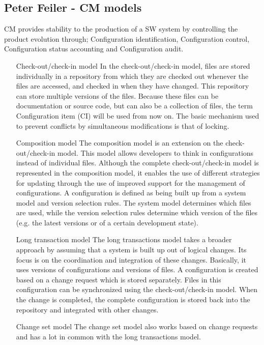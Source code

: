 \documentclass{article}
\begin{document}
\begin{itemize}
\begin{itemize}
    \subsection{Peter Feiler - CM models}
    CM provides stability to the production of a SW system by controlling the product evolution through; Configuration identification, Configuration control, Configuration status accounting and Configuration audit.
    \begin{itemize}
    \item [ Check-out/check-in model]
    In the check-out/check-in model, files are stored individually in a repository from which they are checked out whenever the files are accessed, and checked in when they have changed.
    This repository can store multiple versions of the files. Because these files can be documentation or source code, but can also be a collection of files, the term Configuration item (CI) will be used from now on.
    The basic mechanism used to prevent conflicts by simultaneous modifications is that of locking.
    \item[Composition model]
    The composition model is an extension on the check-out/check-in model. This model allows developers to think in configurations instead of individual files.
    Although the complete check-out/check-in model is represented in the composition model, it enables the use of different strategies for updating through the use of
    improved support for the management of configurations. A configuration is defined as being built up from a system model and version selection rules.
    The system model determines which files are used, while the version selection rules determine which version of the files (e.g. the latest versions or of a certain development state).
    \item[Long transaction model]
    The long transactions model takes a broader approach by assuming that a system is built up out of logical changes.
    Its focus is on the coordination and integration of these changes. Basically, it uses versions of configurations and versions of files.
    A configuration is created based on a change request which is stored separately. Files in this configuration can be synchronized using the check-out/check-in model.
    When the change is completed, the complete configuration is stored back into the repository and integrated with other changes.
    \item[Change set model]
    The change set model also works based on change requests and has a lot in common with the long transactions model.

\end{itemize}
\end{itemize}
\end{itemize}
\end{document}
